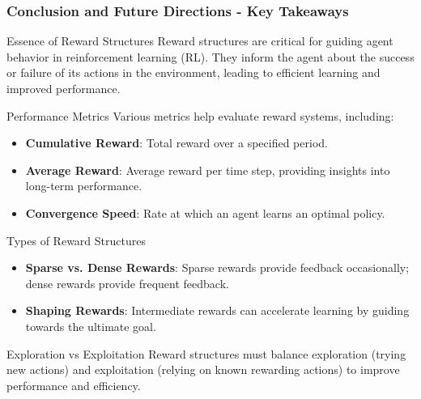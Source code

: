 \documentclass[aspectratio=169]{beamer}
\begin{document}
\begin{frame}[fragile]
    \frametitle{Conclusion and Future Directions - Key Takeaways}
    \begin{block}{Essence of Reward Structures}
        Reward structures are critical for guiding agent behavior in reinforcement learning (RL). They inform the agent about the success or failure of its actions in the environment, leading to efficient learning and improved performance.
    \end{block}
    
    \begin{block}{Performance Metrics}
        Various metrics help evaluate reward systems, including:
        \begin{itemize}
            \item \textbf{Cumulative Reward}: Total reward over a specified period.
            \item \textbf{Average Reward}: Average reward per time step, providing insights into long-term performance.
            \item \textbf{Convergence Speed}: Rate at which an agent learns an optimal policy.
        \end{itemize}
    \end{block}

    \begin{block}{Types of Reward Structures}
        \begin{itemize}
            \item \textbf{Sparse vs. Dense Rewards}: Sparse rewards provide feedback occasionally; dense rewards provide frequent feedback.
            \item \textbf{Shaping Rewards}: Intermediate rewards can accelerate learning by guiding towards the ultimate goal.
        \end{itemize}
    \end{block}

    \begin{block}{Exploration vs Exploitation}
        Reward structures must balance exploration (trying new actions) and exploitation (relying on known rewarding actions) to improve performance and efficiency.
    \end{block}
\end{frame}
\end{document}
